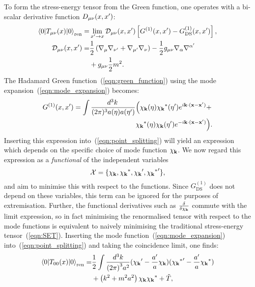 To form the stress-energy tensor from the Green function, one operates with a bi-scalar derivative function $D_{\mu\nu}(x,{{x}^\prime})$:
\begin{align}
  \left\langle0\middle|T_{\mu\nu}(x)\middle|0\right\rangle_\mathrm{ren} =& \lim\limits_{{{x}^\prime}\to x} \mathcal{D}_{\mu\nu}(x,{{x}^\prime}) \left[ G^{(1)}(x,{{x}^\prime}) - G^{(1)}_\mathrm{DS}(x,{{x}^\prime}) \right],
  \label{eqn:point_splitting}
  \\
  \mathcal{D}_{\mu\nu}(x,{{x}^\prime})=& \frac{1}{2}\left( \nabla_{\mu}\nabla_{{{\nu}^\prime}} + \nabla_{{{\mu}^\prime}}\nabla_{\nu} \right) -\frac{1}{2} g_{\mu\nu} \nabla_\alpha \nabla^{{{\alpha}^\prime}} \nonumber\\
  &+ g_{\mu\nu} \frac{1}{2}m^2.  \nonumber
\end{align}
The Hadamard Green function~(\ref{eqn:green_function}) using the mode expansion~(\ref{eqn:mode_expansion}) becomes:
\begin{align}
  G^{(1)}(x,{{x}^\prime}) = 
  \int\frac{d^3 k\:}{(2\pi)^3a(\eta)a({{\eta}^\prime})}&
  \Big(
  \chi_{\mathbf{k}}(\eta)
  {\chi_{\mathbf{k}}}^\ast({{\eta}^\prime})e^{i\mathbf{k}\cdot(\mathbf{x}-{{\mathbf{x}}^\prime})}+\nonumber\\
  &
  {\chi_{\mathbf{k}}}^\ast(\eta)
  \chi_{\mathbf{k}}({{\eta}^\prime})e^{-i\mathbf{k}\cdot(\mathbf{x}-{{\mathbf{x}}^\prime})}
  \Big).
  \nonumber
\end{align}
Inserting this expression into~(\ref{eqn:point_splitting}) will yield an expression which depends on the specific choice of mode function $\chi_{\mathbf{k}}$. We now regard this expression as a {\em functional\/} of the independent variables 
\begin{equation}
  \mathcal{X} = \{\chi_{\mathbf{k}},{\chi_{\mathbf{k}}}^\ast,{{\chi_{\mathbf{k}}}^\prime},{{{\chi_{\mathbf{k}}}^\ast}^\prime}\},
  \label{eqn:vars}
\end{equation}
and aim to minimise this with respect to the functions. Since $G^{(1)}_{\mathrm{DS}}$ does not depend on these variables, this term can be ignored for the purposes of extremisation. Further, the functional derivatives such as $\frac{\delta}{\delta \chi_{\mathbf{k}}}$ commute with the limit expression, so in fact minimising the renormalised tensor with respect to the mode functions is equivalent to naively minimising the traditional stress-energy tensor~(\ref{eqn:SET}). Inserting the mode function~(\ref{eqn:mode_expansion}) into~(\ref{eqn:point_splitting}) and taking the coincidence limit, one finds:
\begin{align}
  \left\langle0\middle|T_{00}(x)\middle|0\right\rangle_\mathrm{ren} = &\frac{1}{2}\int \frac{d^3 k}{{(2\pi)}^3 a^2} ({{\chi_{\mathbf{k}}}^\prime}-\frac{{{a}^\prime}}{a}\chi_{\mathbf{k}})({{{\chi_{\mathbf{k}}}^\ast}^\prime}-\frac{{{a}^\prime}}{a}{\chi_{\mathbf{k}}}^\ast)
  \nonumber \\
  &+\left( k^2 + m^2a^2 \right)\chi_{\mathbf{k}} {\chi_{\mathbf{k}}}^\ast + \tilde{T},
\end{align}
